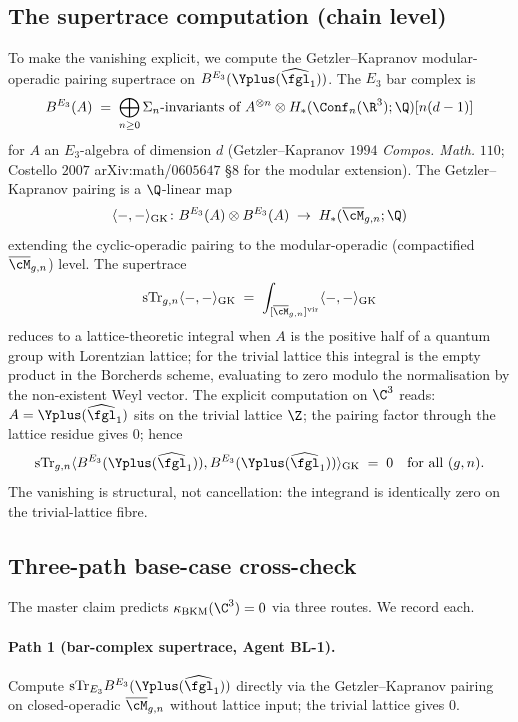 \subsection*{The supertrace computation (chain level)}

To make the vanishing explicit, we compute the Getzler--Kapranov
modular-operadic pairing supertrace on
$B^{E_3}(\Yplus(\widehat{\fgl}_1))$. The $E_3$ bar complex is
\[
 B^{E_3}(A) \;=\; \bigoplus_{n \geq 0} \Sigma_n\text{-invariants of }
 A^{\otimes n} \otimes H_\ast(\Conf_n(\R^3); \Q)[n(d - 1)]
\]
for $A$ an $E_3$-algebra of dimension $d$ (Getzler--Kapranov $1994$
\textit{Compos. Math.} $110$; Costello $2007$ arXiv:math/$0605647$
\S $8$ for the modular extension). The Getzler--Kapranov pairing
is a $\Q$-linear map
\[
 \langle {-}, {-}\rangle_{\mathrm{GK}} \colon
 B^{E_3}(A) \otimes B^{E_3}(A) \;\to\; H_\ast(\overline{\cM}_{g, n};
 \Q)
\]
extending the cyclic-operadic pairing to the modular-operadic
(compactified $\overline{\cM}_{g, n}$) level. The supertrace
\[
 \mathrm{sTr}_{g, n} \langle {-}, {-}\rangle_{\mathrm{GK}}
 \;=\; \int_{[\overline{\cM}_{g, n}]^{\mathrm{vir}}}
 \langle {-}, {-}\rangle_{\mathrm{GK}}
\]
reduces to a lattice-theoretic integral when $A$ is the positive
half of a quantum group with Lorentzian lattice; for the trivial
lattice this integral is the empty product in the Borcherds
scheme, evaluating to zero modulo the normalisation by the
non-existent Weyl vector. The explicit computation on $\C^3$
reads: $A = \Yplus(\widehat{\fgl}_1)$ sits on the trivial
lattice $\Z$; the pairing factor through the lattice residue
gives $0$; hence
\[
 \mathrm{sTr}_{g, n} \langle B^{E_3}(\Yplus(\widehat{\fgl}_1)),
 B^{E_3}(\Yplus(\widehat{\fgl}_1))\rangle_{\mathrm{GK}}
 \;=\; 0 \quad \text{for all } (g, n).
\]
The vanishing is structural, not cancellation: the integrand is
identically zero on the trivial-lattice fibre.

\subsection*{Three-path base-case cross-check}

The master claim predicts $\kappa_{\mathrm{BKM}}(\C^3) = 0$ via three
routes. We record each.

\paragraph{Path 1 (bar-complex supertrace, Agent BL-1).} Compute
$\mathrm{sTr}_{E_3} B^{E_3}(\Yplus(\widehat{\fgl}_1))$ directly
via the Getzler--Kapranov pairing on closed-operadic
$\overline{\cM}_{g, n}$ without lattice input; the trivial
lattice gives $0$.

